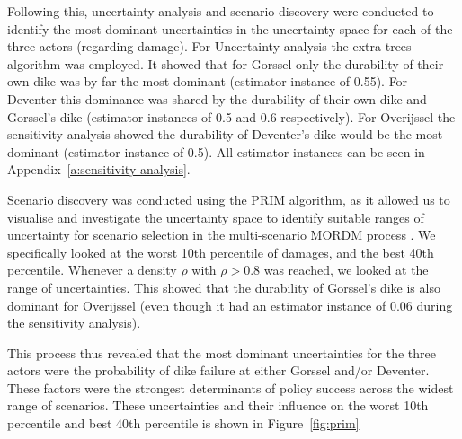 Following this, uncertainty analysis and scenario discovery were conducted to identify the most dominant uncertainties in the uncertainty space for each of the three actors (regarding damage). For Uncertainty analysis the extra trees algorithm was employed. It showed that for Gorssel only the durability of their own dike was by far the most dominant (estimator instance of 0.55). For Deventer this dominance was shared by the durability of their own dike and Gorssel's dike (estimator instances of 0.5 and 0.6 respectively). For Overijssel the sensitivity analysis showed the durability of Deventer's dike would be the most dominant (estimator instance of 0.5). All estimator instances can be seen in Appendix~\ref{a:sensitivity-analysis}.

Scenario discovery was conducted using the PRIM algorithm, as it allowed us to visualise and investigate the uncertainty space to identify suitable ranges of uncertainty for scenario selection in the multi-scenario MORDM process \parencite{bryant_thinking_2010}. We specifically looked at the worst 10th percentile of damages, and the best 40th percentile. Whenever a density $\rho$ with $\rho>0.8$ was reached, we looked at the range of uncertainties. This showed that the durability of Gorssel's dike is also dominant for Overijssel (even though it had an estimator instance of 0.06 during the sensitivity analysis).

This process thus revealed that the most dominant uncertainties for the three actors were the probability of dike failure at either Gorssel and/or Deventer. These factors were the strongest determinants of policy success across the widest range of scenarios. These uncertainties and their influence on the worst 10th percentile and best 40th percentile is shown in Figure~\ref{fig:prim}

